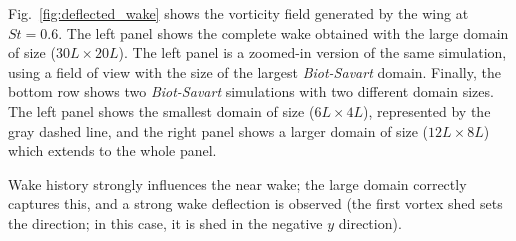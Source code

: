 \documentclass{article}
\begin{document}
Fig.~\ref{fig:deflected_wake} shows the vorticity field generated by the wing at $St=0.6$. The left panel shows the complete wake obtained with the large domain of size ($30L\times20L$). The left panel is a zoomed-in version of the same simulation, using a field of view with the size of the largest \emph{Biot-Savart} domain. Finally, the bottom row shows two \emph{Biot-Savart} simulations with two different domain sizes. The left panel shows the smallest domain of size ($6L\times4L$), represented by the gray dashed line, and the right panel shows a larger domain of size ($12L\times8L$) which extends to the whole panel.

Wake history strongly influences the near wake; the large domain correctly captures this, and a strong wake deflection is observed (the first vortex shed sets the direction; in this case, it is shed in the negative $y$ direction).
\end{document}
